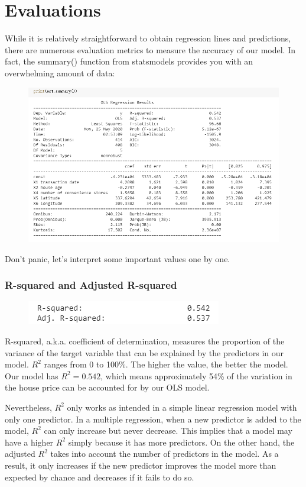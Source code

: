\documentclass{article}
\begin{document}
\section*{Evaluations}
While it is relatively straightforward to obtain regression lines and predictions, there are numerous evaluation metrics to measure the accuracy of our model. In fact, the summary() function from statsmodels provides you with an overwhelming amount of data:
\begin{figure}[H]\includegraphics[width=\linewidth]{25}\end{figure}
Don't panic, let's interpret some important values one by one.
\subsubsection*{R-squared and Adjusted R-squared}
\begin{figure}[H]\includegraphics[width=0.5\linewidth]{26}\end{figure}
R-squared, a.k.a. coefficient of determination, measures the proportion of the variance of the target variable that can be explained by the predictors in our model. $R^2$ ranges from 0 to 100\%. The higher the value, the better the model.
Our model has $R^2 = 0.542$, which means approximately 54\% of the variation in the house price can be accounted for by our OLS model.

Nevertheless, $R^2$ only works as intended in a simple linear regression model with only one predictor. In a multiple regression, when a new predictor is added to the model, $R^2$ can only increase but never decrease. This implies that a model may have a higher $R^2$ simply because it has more predictors. On the other hand, the adjusted $R^2$ takes into account the number of predictors in the model. As a result, it only increases if the new predictor improves the model more than expected by chance and decreases if it fails to do so.
\end{document}
